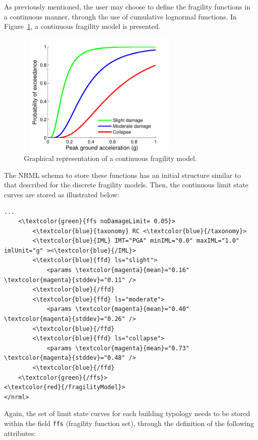 As previously mentioned, the user may choose to define the \glspl{fragility function} in a continuous manner, through the use of cumulative lognormal functions. In Figure~\ref{fig:fragModelContinuous}, a continuous fragility model is presented.

\begin{figure}[ht]
\centering
\includegraphics[width=8cm,height=6cm]{figures/risk/ConFragilityModel.pdf}
\caption{Graphical representation of a continuous fragility model.}
\label{fig:fragModelContinuous}
\end{figure}

The NRML schema to store these functions has an initial structure similar to that described for the discrete \glspl{fragility model}. Then, the continuous limit state curves are stored as illustrated below:

\begin{Verbatim}[frame=single, commandchars=\\\{\}, samepage=true]
    ...
    <\textcolor{green}{ffs noDamageLimit= 0.05}>
        <\textcolor{blue}{taxonomy} RC <\textcolor{blue}{/taxonomy}>
        <\textcolor{blue}{IML} IMT="PGA" minIML="0.0" maxIML="1.0" imlUnit="g" ><\textcolor{blue}{/IML}>
        <\textcolor{blue}{ffd} ls="slight">
            <params \textcolor{magenta}{mean}="0.16" \textcolor{magenta}{stddev}="0.11" />
        <\textcolor{blue}{/ffd}
        <\textcolor{blue}{ffd} ls="moderate">
            <params \textcolor{magenta}{mean}="0.40" \textcolor{magenta}{stddev}="0.26" />
        <\textcolor{blue}{/ffd}
        <\textcolor{blue}{ffd} ls="collapse">
            <params \textcolor{magenta}{mean}="0.73" \textcolor{magenta}{stddev}="0.48" />
        <\textcolor{blue}{/ffd}
    <\textcolor{green}{/ffs}>
<\textcolor{red}{/fragilityModel}>
</nrml>
\end{Verbatim}

Again, the set of limit state curves for each building typology needs to be stored within the field \Verb+ffs+ (fragility function set), through the definition of the following attributes:

